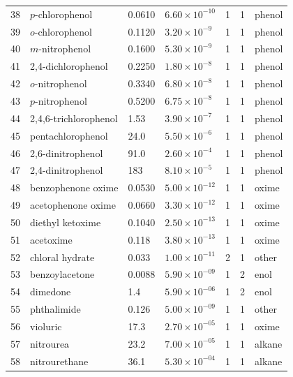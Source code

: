 \begin{longtable}{r l l l c c l}
38 & {$p$-chlorophenol}         & 0.0610  & $6.60 \times 10^{-10} $ & 1 & 1 & phenol \\
39 & {$o$-chlorophenol}         & 0.1120  & $3.20 \times 10^{-9}  $ & 1 & 1 & phenol \\
40 & {$m$-nitrophenol}          & 0.1600  & $5.30 \times 10^{-9}  $ & 1 & 1 & phenol \\
41 & {2,4-dichlorophenol}       & 0.2250  & $1.80 \times 10^{-8}  $ & 1 & 1 & phenol \\
42 & {$o$-nitrophenol}          & 0.3340  & $6.80 \times 10^{-8}  $ & 1 & 1 & phenol \\
43 & {$p$-nitrophenol}          & 0.5200  & $6.75 \times 10^{-8}  $ & 1 & 1 & phenol \\
44 & {2,4,6-trichlorophenol}    & 1.53    & $3.90 \times 10^{-7}  $ & 1 & 1 & phenol \\
45 & {pentachlorophenol}        & 24.0    & $5.50 \times 10^{-6}  $ & 1 & 1 & phenol \\
46 & {2,6-dinitrophenol}        & 91.0    & $2.60 \times 10^{-4}  $ & 1 & 1 & phenol \\
47 & {2,4-dinitrophenol}        & 183     & $8.10 \times 10^{-5}  $ & 1 & 1 & phenol \\
48 & {benzophenone oxime}       & 0.0530  & $5.00 \times 10^{-12} $ & 1 & 1 & oxime \\
49 & {acetophenone oxime}       & 0.0660  & $3.30 \times 10^{-12} $ & 1 & 1 & oxime \\
50 & {diethyl ketoxime}         & 0.1040  & $2.50 \times 10^{-13} $ & 1 & 1 & oxime \\
51 & {acetoxime}                & 0.118   & $3.80 \times 10^{-13} $ & 1 & 1 & oxime \\
52 & {chloral hydrate}          & 0.033   & $1.00 \times 10^{-11} $ & 2 & 1 & other\\
53 & {benzoylacetone}           & 0.0088  & $5.90 \times 10^{-09} $ & 1 & 2 & enol \\
54 & {dimedone}                 & 1.4     & $5.90 \times 10^{-06} $ & 1 & 2 & enol \\
55 & {phthalimide}              & 0.126   & $5.00 \times 10^{-09} $ & 1 & 1 & other \\
56 & {violuric}                 & 17.3    & $2.70 \times 10^{-05} $ & 1 & 1 & oxime \\
57 & {nitrourea}                & 23.2    & $7.00 \times 10^{-05} $ & 1 & 1 & alkane \\
58 & {nitrourethane}            & 36.1    & $5.30 \times 10^{-04} $ & 1 & 1 & alkane \\

\end{longtable}
